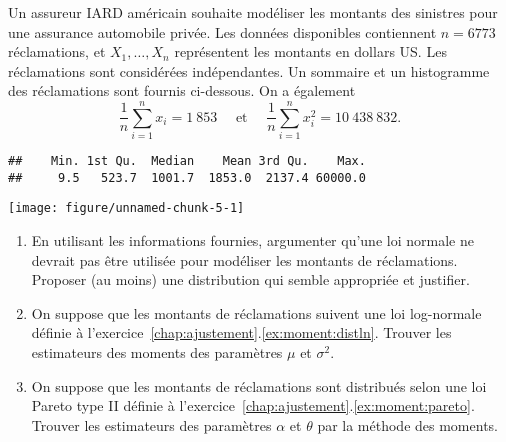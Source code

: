 
\begin{exercice}
Un assureur IARD américain souhaite modéliser les montants des sinistres pour une assurance automobile privée. Les données disponibles contiennent $n=6773$ réclamations, et $X_1,\ldots,X_n$ représentent les montants en dollars US. Les réclamations sont considérées indépendantes. Un sommaire et un histogramme des réclamations sont fournis ci-dessous. On a également
$$
\frac{1}{n}\sum_{i=1}^n x_i=1~853 \quad \mbox{ et }\quad \frac{1}{n}\sum_{i=1}^n x_i^2=10~438~832.
$$



\begin{knitrout}
\color{fgcolor}\begin{kframe}
\begin{alltt}
\end{alltt}
\begin{verbatim}
##    Min. 1st Qu.  Median    Mean 3rd Qu.    Max. 
##     9.5   523.7  1001.7  1853.0  2137.4 60000.0
\end{verbatim}
\end{kframe}
\texttt{[image: figure/unnamed-chunk-5-1]} 

\end{knitrout}


\begin{enumerate}
\item En utilisant les informations fournies, argumenter qu'une loi normale ne devrait pas être utilisée pour modéliser les montants de réclamations. Proposer (au moins) une distribution qui semble appropriée et justifier.

\item On suppose que les montants de réclamations suivent une loi log-normale définie à l'exercice~\ref{chap:ajustement}.\ref{ex:moment:distln}. Trouver les estimateurs des moments des paramètres $\mu$ et $\sigma^2$.

\item On suppose que les montants de réclamations sont distribués selon une loi Pareto type II définie à l'exercice~\ref{chap:ajustement}.\ref{ex:moment:pareto}. Trouver les estimateurs des paramètres $\alpha$ et $\theta$ par la méthode des moments.


\end{enumerate}
\end{exercice}
